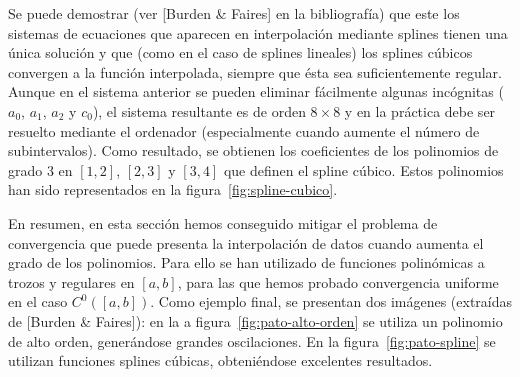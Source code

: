    Se puede demostrar (ver [Burden \& Faires] en la bibliografía) que
   este los sistemas de ecuaciones que aparecen en interpolación
   mediante splines tienen una única solución y que (como en el caso de
   splines lineales) los splines cúbicos convergen a la función
   interpolada, siempre que ésta sea suficientemente regular. Aunque
   en el sistema anterior se pueden eliminar fácilmente algunas
   incógnitas ($a_0$, $a_1$, $a_2$ y $c_0$), el sistema resultante es
   de orden $8\times 8$ y en la práctica debe ser resuelto mediante el
   ordenador (especialmente cuando  aumente el número de
   subintervalos). Como resultado, se obtienen los coeficientes de los
   polinomios de grado $3$ en $[1,2]$, $[2,3]$ y $[3,4]$ que definen
   el spline cúbico. Estos polinomios han sido representados en la
   figura~\ref{fig:spline-cubico}.


   En resumen, en esta sección hemos conseguido mitigar el problema de
   convergencia que puede presenta la interpolación de datos cuando
   aumenta el grado de los polinomios. Para ello se han utilizado de
   funciones polinómicas a trozos y regulares en $[a,b]$, para las que
   hemos probado convergencia uniforme en el caso $C^0([a,b])$. Como
   ejemplo final, se presentan dos imágenes (extraídas de [Burden \&
   Faires]): en la a figura~\ref{fig:pato-alto-orden} se utiliza un
   polinomio de alto orden, generándose grandes oscilaciones. En la
   figura~\ref{fig:pato-spline} se utilizan funciones splines cúbicas,
   obteniéndose excelentes resultados.


